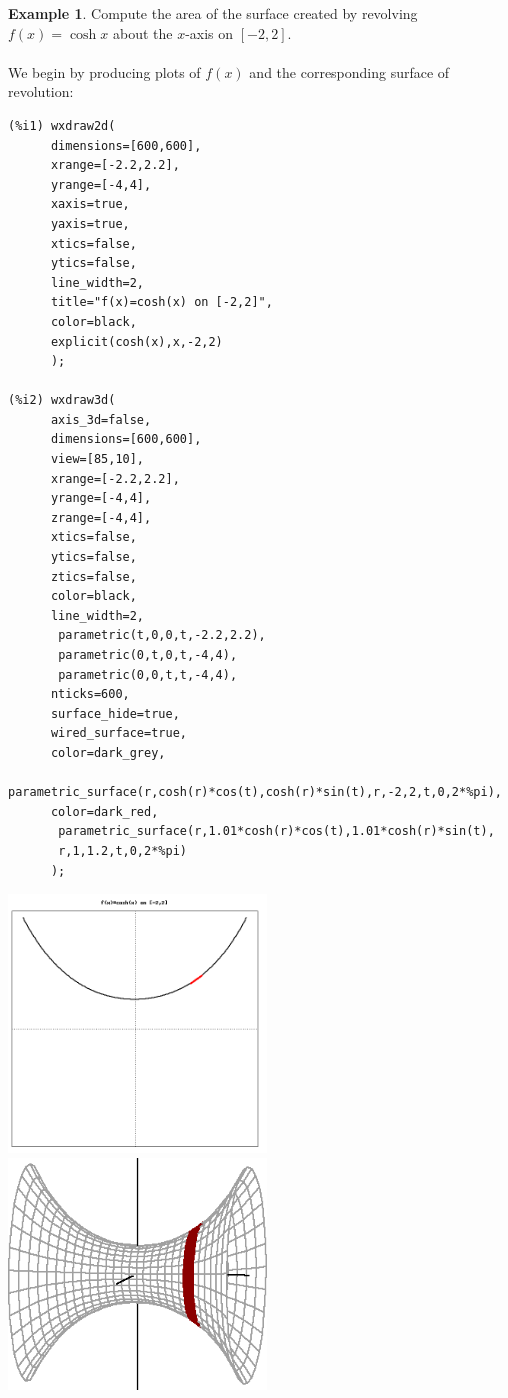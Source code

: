 \documentclass[10.5pt,twoside]{report}
\theoremstyle{definition}
\newtheorem{exmp}{Example}[section]
\begin{document}
\begin{exmp} Compute the area of the surface created by revolving $f(x)=\cosh{x}$ about the $x$-axis on $[-2,2]$.  \\
${}$\\
We begin by producing plots of $f(x)$ and the corresponding surface of revolution:

\begin{verbatim}
(%i1) wxdraw2d(
      dimensions=[600,600],
      xrange=[-2.2,2.2],
      yrange=[-4,4],
      xaxis=true,
      yaxis=true,
      xtics=false,
      ytics=false,
      line_width=2,
      title="f(x)=cosh(x) on [-2,2]",
      color=black,
      explicit(cosh(x),x,-2,2)
      );

(%i2) wxdraw3d(  
      axis_3d=false,
      dimensions=[600,600],
      view=[85,10],
      xrange=[-2.2,2.2],
      yrange=[-4,4],
      zrange=[-4,4],
      xtics=false,
      ytics=false,
      ztics=false,
      color=black,
      line_width=2,
       parametric(t,0,0,t,-2.2,2.2),
       parametric(0,t,0,t,-4,4),
       parametric(0,0,t,t,-4,4),
      nticks=600,
      surface_hide=true,
      wired_surface=true,
      color=dark_grey,
       parametric_surface(r,cosh(r)*cos(t),cosh(r)*sin(t),r,-2,2,t,0,2*%pi),
      color=dark_red,
       parametric_surface(r,1.01*cosh(r)*cos(t),1.01*cosh(r)*sin(t),
       r,1,1.2,t,0,2*%pi)
      );
\end{verbatim}

\includegraphics[width=2.7in]{example_3_4_1_1}
\includegraphics[width=2.7in]{example_3_4_1_2}


\end{exmp}
\end{document}
